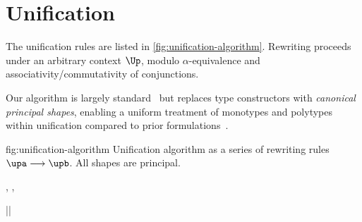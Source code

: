 \documentclass[acmsmall,screen,nonacm,review]{acmart}
\begin{document}
\section{Unification}
\label{app:unification}

The unification rules are listed in \cref{fig:unification-algorithm}.
Rewriting proceeds under an arbitrary context $\Up$, modulo $\alpha$-equivalence
and associativity/commutativity of conjunctions.

Our algorithm is largely standard~\citep*{Pottier-Remy/emlti} but replaces type
constructors with \emph{canonical principal shapes}, enabling a uniform
treatment of monotypes and polytypes within unification compared to
prior formulations~\citep*{Garrigue-Remy/poly-ml}.

%


\begin{mathparfig}[htpb!]
  {fig:unification-algorithm}
  {Unification algorithm as a series of rewriting rules
   $\upa \unif \upb$. All shapes are principal.}
   \rewrite[U-Exists]
      {(\cexists \alpha \upa) \cand \upb }{ \tv \disjoint \upb}
      {\cexists \tv {\upa \cand \upb}}

    \rewrite[U-Cycle]
      {\up }{ \cyclic \up}
      {\cfalse}

    \rewrite[U-True]
      {\up \cand \ctrue}
      {}
      {\up}

    \rewrite[U-False]
      {\Up\where\cfalse }{ \Up \neq \square}
      {\cfalse}

    \rewrite[U-Merge]
      {\cunif \tv \ueqa \cand \cunif \tv \ueqb}
      {}
      {\cunif \tv {\cunif \ueqa \ueqb}}

    \rewrite[U-Stutter]
      {\cunif \tv {\cunif \tv \ueq}}
      {}
      {\cunif \tv \ueq}

    \rewrite[U-Name]
      {\cunif {\pshapp \parens{\tys, \ti, \typs}} \ueq }
      { \tv \disjoint \tys, \typs, \ueq \\ \ti \notin \TyVars}
      {\cexists \tv {\cunif \tv \ti \cand \cunif {\pshapp \parens{\tys, \tv, \typs}} \ueq}}

    \rewrite[U-Decomp]
      {\cunif {\pshapp \tvs} {\cunif {\pshapp \tvbs} \ueq}}
      {}
      {\cunif {\pshapp \tvs} \ueq \cand \cunif \tvs \tvbs}

    \rewrite[U-Clash]
      {\cunif {\pshapp \tvs} {\cunif {\pshapp[\shp]\tvbs } \ueq }}{
       \sh \neq \shp}
      {\cfalse}

    \rewrite[U-Trivial]
      {\ueq }
      {|\ueq| }
      {\ctrue}
\end{mathparfig}
\end{document}
